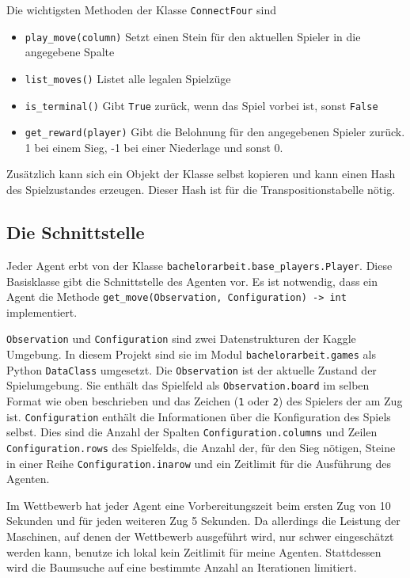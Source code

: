 Die wichtigsten Methoden der Klasse \verb|ConnectFour| sind
\begin{itemize}
	\item \verb|play_move(column)| Setzt einen Stein für den aktuellen Spieler in die angegebene Spalte
	\item \verb|list_moves()| Listet alle legalen Spielzüge
	\item \verb|is_terminal()| Gibt \verb|True| zurück, wenn das Spiel vorbei ist, sonst \verb|False|
	\item \verb|get_reward(player)| Gibt die Belohnung für den angegebenen Spieler zurück.\\1 bei einem Sieg, -1 bei einer Niederlage und sonst 0.
\end{itemize}

Zusätzlich kann sich ein Objekt der Klasse selbst kopieren und kann einen Hash des Spielzustandes erzeugen.
Dieser Hash ist für die Transpositionstabelle nötig.

\subsection{Die Schnittstelle}
\label{chap:schnittstelle}
Jeder Agent erbt von der Klasse \verb|bachelorarbeit.base_players.Player|.
Diese Basisklasse gibt die Schnittstelle des Agenten vor.
Es ist notwendig, dass ein Agent die Methode \verb|get_move(Observation, Configuration) -> int| implementiert.

\verb|Observation| und \verb|Configuration| sind zwei Datenstrukturen der Kaggle Umgebung.
In diesem Projekt sind sie im Modul \verb|bachelorarbeit.games| als Python \verb|DataClass| umgesetzt.
Die \verb|Observation| ist der aktuelle Zustand der Spielumgebung.
Sie enthält das Spielfeld als \verb|Observation.board| im selben Format wie oben beschrieben und das Zeichen (\verb|1| oder \verb|2|) des Spielers der am Zug ist.
\verb|Configuration| enthält die Informationen über die Konfiguration des Spiels selbst.
Dies sind die Anzahl der Spalten \verb|Configuration.columns| und Zeilen \verb|Configuration.rows| des Spielfelds, die Anzahl der, für den Sieg nötigen, Steine in einer Reihe \verb|Configuration.inarow| und ein Zeitlimit für die Ausführung des Agenten.

Im Wettbewerb hat jeder Agent eine Vorbereitungszeit beim ersten Zug von 10 Sekunden und für jeden weiteren Zug 5 Sekunden.
Da allerdings die Leistung der Maschinen, auf denen der Wettbewerb ausgeführt wird, nur schwer eingeschätzt werden kann, benutze ich lokal kein Zeitlimit für meine Agenten.
Stattdessen wird die Baumsuche auf eine bestimmte Anzahl an Iterationen limitiert.

